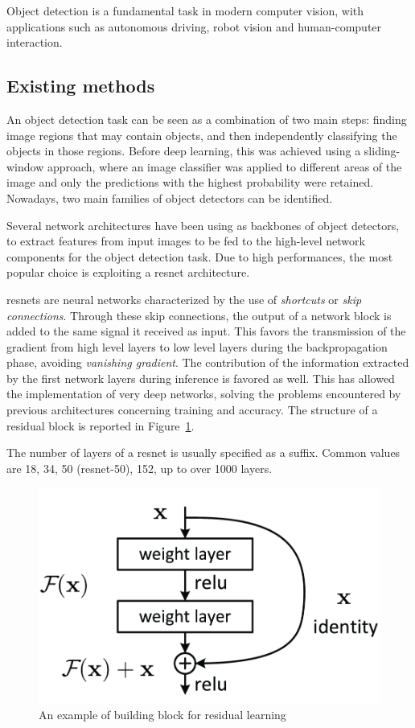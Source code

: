 \documentclass[%
    corpo=12pt,
    twoside,
    stile=classica,   
    tipotesi=magistrale,
    evenboxes,
    english,
	numerazioneromana,
]{toptesi}
\begin{document}
Object detection is a fundamental task in modern computer vision, with applications such as autonomous driving, robot vision and human-computer interaction.

\subsection{Existing methods}\label{sec:detectors}
An object detection task can be seen as a combination of two main steps: finding image regions that may contain objects, and then independently classifying the objects in those regions. Before deep learning, this was achieved using a sliding-window approach, where an image classifier was applied to different areas of the image and only the predictions with the highest probability were retained. Nowadays, two main families of object detectors can be identified.

\bigskip
Several network architectures have been using as backbones of object detectors, to extract features from input images to be fed to the high-level network components for the object detection task. Due to high performances, the most popular choice is exploiting a \gls{resnet} architecture\cite{he2015deep}.

\Glspl{resnet} are neural networks characterized by the use of \textit{shortcuts} or \textit{skip connections}. Through these skip connections, the output of a network block is added to the same signal it received as input. This favors the transmission of the gradient from high level layers to low level layers during the backpropagation phase, avoiding \textit{vanishing gradient}. The contribution of the information extracted by the first network layers during inference is favored as well. This has allowed the implementation of very deep networks, solving the problems encountered by previous architectures concerning training and accuracy. The structure of a residual block is reported in Figure~\ref{fig:resnet}.

The number of layers of a \gls{resnet} is usually specified as a suffix. Common values are 18, 34, 50 (\gls{resnet}-50), 152, up to over 1000 layers\cite{he2016identity}.

\begin{figure}[ht]
	\centering
	\includegraphics[width=.5\textwidth]{imgs/resnet.png}
	\caption{An example of building block for residual learning\cite{he2015deep}}
	\label{fig:resnet}
\end{figure}
\end{document}

